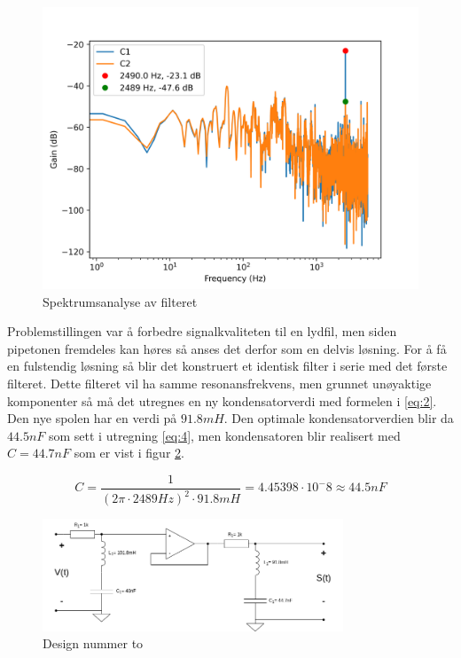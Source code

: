 \begin{figure}[!h]
	\centering
	\includegraphics[width=1\textwidth]{Bilder/spectrum2K.png}
	\caption{Spektrumsanalyse av filteret}
	\label{fig:fig7}
\end{figure}

Problemstillingen var å forbedre signalkvaliteten til en lydfil, men siden pipetonen fremdeles kan høres så anses det derfor som en delvis løsning. For å få en fulstendig løsning så blir det konstruert et identisk filter i serie med det første filteret. Dette filteret vil ha samme resonansfrekvens, men grunnet unøyaktige komponenter så må det utregnes en ny kondensatorverdi med formelen i \ref{eq:2}. Den nye spolen har en verdi på $91.8mH$. Den optimale kondensatorverdien blir da $44.5nF$ som sett i utregning \ref{eq:4}, men kondensatoren blir realisert med $C = 44.7nF$ som er vist i figur \ref{fig:fig8}.

\begin{equation}
	C = \frac{1}{(2\pi \cdot 2489Hz)^2 \cdot 91.8mH} = 4.45398 \cdot 10^-8 \approx 44.5nF
	\label{eq:4}
\end{equation}

\begin{figure}[!h]
	\centering
	\includegraphics[width=0.8\textwidth]{Bilder/RLC_filterV2.drawio.png}
	\caption{Design nummer to}
	\label{fig:fig8}
\end{figure}

